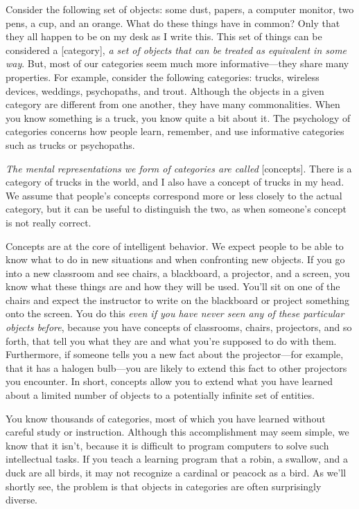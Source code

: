 \documentclass[
]{krantz}
\begin{document}
Consider the following set of objects: some dust, papers, a computer monitor, two pens, a cup, and an orange. What do these things have in common? Only that they all happen to be on my desk as I write this. This set of things can be considered a {[}category{]}, \emph{a set of objects that can be treated as equivalent in some way}. But, most of our categories seem much more informative---they share many properties. For example, consider the following categories: trucks, wireless devices, weddings, psychopaths, and trout. Although the objects in a given category are different from one another, they have many commonalities. When you know something is a truck, you know quite a bit about it. The psychology of categories concerns how people learn, remember, and use informative categories such as trucks or psychopaths.

\emph{The mental representations we form of categories are called} {[}concepts{]}. There is a category of trucks in the world, and I also have a concept of trucks in my head. We assume that people's concepts correspond more or less closely to the actual category, but it can be useful to distinguish the two, as when someone's concept is not really correct.

Concepts are at the core of intelligent behavior. We expect people to be able to know what to do in new situations and when confronting new objects. If you go into a new classroom and see chairs, a blackboard, a projector, and a screen, you know what these things are and how they will be used. You'll sit on one of the chairs and expect the instructor to write on the blackboard or project something onto the screen. You do this \emph{even if you have never seen any of these particular objects before}, because you have concepts of classrooms, chairs, projectors, and so forth, that tell you what they are and what you're supposed to do with them. Furthermore, if someone tells you a new fact about the projector---for example, that it has a halogen bulb---you are likely to extend this fact to other projectors you encounter. In short, concepts allow you to extend what you have learned about a limited number of objects to a potentially infinite set of entities.

You know thousands of categories, most of which you have learned without careful study or instruction. Although this accomplishment may seem simple, we know that it isn't, because it is difficult to program computers to solve such intellectual tasks. If you teach a learning program that a robin, a swallow, and a duck are all birds, it may not recognize a cardinal or peacock as a bird. As we'll shortly see, the problem is that objects in categories are often surprisingly diverse.
\end{document}
